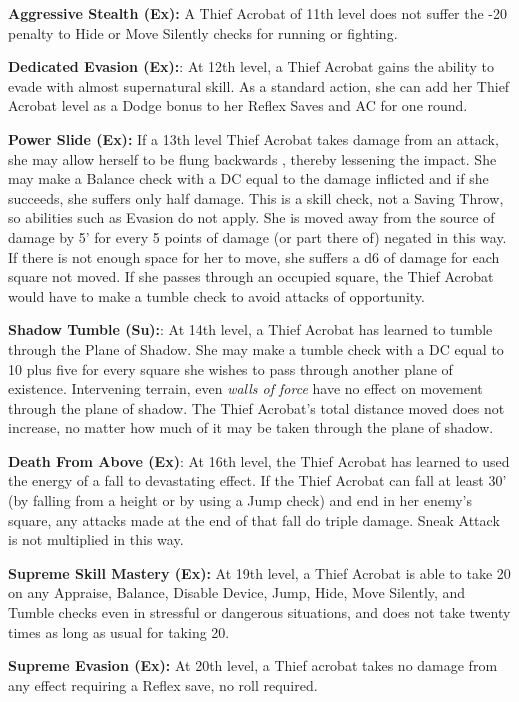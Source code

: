 \textbf{Aggressive Stealth (Ex):} A Thief Acrobat of 11th level does not suffer the -20 penalty to Hide or Move Silently checks for running or fighting.

\textbf{Dedicated Evasion (Ex):}: At 12th level, a Thief Acrobat gains the ability to evade with almost supernatural skill. As a standard action, she can add her Thief Acrobat level as a Dodge bonus to her Reflex Saves and AC for one round.

\textbf{Power Slide (Ex):} If a 13th level Thief Acrobat takes damage from an attack, she may allow herself to be flung backwards , thereby lessening the impact. She may make a Balance check with a DC equal to the damage inflicted and if she succeeds, she suffers only half damage. This is a skill check, not a Saving Throw, so abilities such as Evasion do not apply. She is moved away from the source of damage by 5' for every 5 points of damage (or part there of) negated in this way. If there is not enough space for her to move, she suffers a d6 of damage for each square not moved. If she passes through an occupied square, the Thief Acrobat would have to make a tumble check to avoid attacks of opportunity.

\textbf{Shadow Tumble (Su):}: At 14th level, a Thief Acrobat has learned to tumble through the Plane of Shadow. She may make a tumble check with a DC equal to 10 plus five for every square she wishes to pass through another plane of existence. Intervening terrain, even \textit{walls of force} have no effect on movement through the plane of shadow. The Thief Acrobat's total distance moved does not increase, no matter how much of it may be taken through the plane of shadow.

\textbf{Death From Above (Ex)}: At 16th level, the Thief Acrobat has learned to used the energy of a fall to devastating effect. If the Thief Acrobat can fall at least 30' (by falling from a height or by using a Jump check) and end in her enemy's square, any attacks made at the end of that fall do triple damage. Sneak Attack is not multiplied in this way.

\textbf{Supreme Skill Mastery (Ex):} At 19th level, a Thief Acrobat is able to take 20 on any Appraise, Balance, Disable Device, Jump, Hide, Move Silently, and Tumble checks even in stressful or dangerous situations, and does not take twenty times as long as usual for taking 20.

\textbf{Supreme Evasion (Ex):} At 20th level, a Thief acrobat takes no damage from any effect requiring a Reflex save, no roll required.